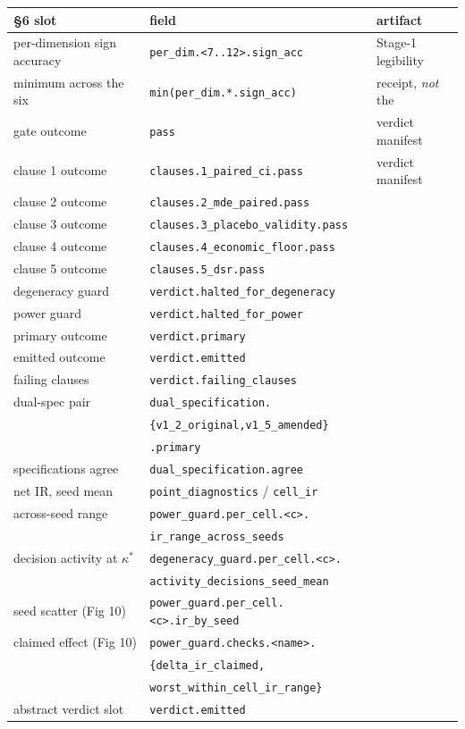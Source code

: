 \begin{center}
\small
\begin{tabularx}{\linewidth}{llX}
\toprule
\S6 slot & field & artifact \\
\midrule
per-dimension sign accuracy & \texttt{per\_dim.<7..12>.sign\_acc} & Stage-1 legibility \\
minimum across the six & \texttt{min(per\_dim.*.sign\_acc)} & receipt, \emph{not} the \\
gate outcome & \texttt{pass} & verdict manifest \\
\midrule
clause 1 outcome & \texttt{clauses.1\_paired\_ci.pass} & verdict manifest \\
clause 2 outcome & \texttt{clauses.2\_mde\_paired.pass} & \\
clause 3 outcome & \texttt{clauses.3\_placebo\_validity.pass} & \\
clause 4 outcome & \texttt{clauses.4\_economic\_floor.pass} & \\
clause 5 outcome & \texttt{clauses.5\_dsr.pass} & \\
degeneracy guard & \texttt{verdict.halted\_for\_degeneracy} & \\
power guard & \texttt{verdict.halted\_for\_power} & \\
primary outcome & \texttt{verdict.primary} & \\
emitted outcome & \texttt{verdict.emitted} & \\
failing clauses & \texttt{verdict.failing\_clauses} & \\
dual-spec pair & \texttt{dual\_specification.} & \\
 & \quad\texttt{\{v1\_2\_original,v1\_5\_amended\}} & \\
 & \quad\texttt{.primary} & \\
specifications agree & \texttt{dual\_specification.agree} & \\
net IR, seed mean & \texttt{point\_diagnostics} / \texttt{cell\_ir} & \\
across-seed range & \texttt{power\_guard.per\_cell.<c>.} & \\
 & \quad\texttt{ir\_range\_across\_seeds} & \\
decision activity at $\kappa^\ast$ & \texttt{degeneracy\_guard.per\_cell.<c>.} & \\
 & \quad\texttt{activity\_decisions\_seed\_mean} & \\
seed scatter (Fig 10) & \texttt{power\_guard.per\_cell.<c>.ir\_by\_seed} & \\
claimed effect (Fig 10) & \texttt{power\_guard.checks.<name>.} & \\
 & \quad\texttt{\{delta\_ir\_claimed,} & \\
 & \quad\texttt{worst\_within\_cell\_ir\_range\}} & \\
abstract verdict slot & \texttt{verdict.emitted} & \\
\bottomrule
\end{tabularx}
\end{center}

